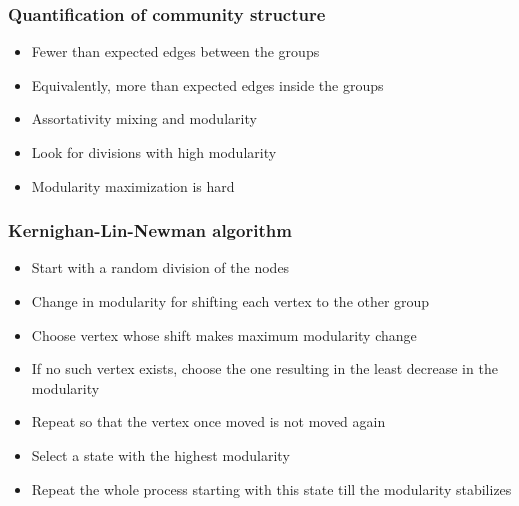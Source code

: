 \documentclass{beamer}
\begin{document}
\begin{frame}
    \frametitle{Quantification of community structure}
    \centering

    \begin{itemize}
        \setlength\itemsep{1em}
        \item{Fewer than expected edges between the groups}
            \pause
        \item{Equivalently, more than expected edges inside the groups}
            \pause
        \item{Assortativity mixing and modularity}
            \pause
        \item{Look for divisions with high modularity}
            \pause
        \item{Modularity maximization is hard}
    \end{itemize}

\end{frame}
\begin{frame}
    \frametitle{Kernighan-Lin-Newman algorithm}
    \centering

    \begin{itemize}
        \setlength\itemsep{1em}
        \item{Start with a random division of the nodes}
            \pause
        \item{Change in modularity for shifting each vertex to the other group}
            \pause
        \item{Choose vertex whose shift makes maximum modularity change}
            \pause
        \item{If no such vertex exists, choose the one resulting in the least decrease in the modularity}
            \pause
        \item{Repeat so that the vertex once moved is not moved again}
            \pause
        \item{Select a state with the highest modularity}
            \pause
        \item{Repeat the whole process starting with this state till the modularity stabilizes}
    \end{itemize}
\end{frame}
\end{document}
